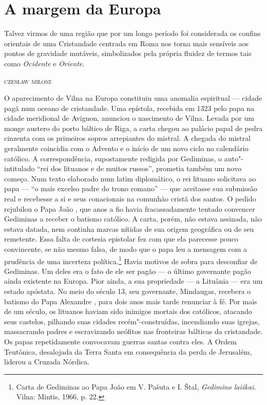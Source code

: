 %

\chapter{A margem da Europa}

\epigraph{Talvez virmos de uma região que por um longo período foi considerada os
confins orientais de uma Cristandade centrada em Roma nos torna mais
sensíveis aos pontos de gravidade mutáveis, simbolizados pela própria
fluidez de termos tais como \textit{Ocidente} e \textit{Oriente}.}{\textsc{czesław miłosz}}

O aparecimento de Vilna na Europa constituiu uma anomalia espiritual ---
cidade pagã num oceano de cristandade. Uma epístola, recebida em 1323
pelo papa na cidade meridional de Avignon, anunciou o nascimento de
Vilna. Levada por um monge austero do porto báltico de Riga, a carta
chegou ao palácio papal de pedra cinzenta com os primeiros sopros
arrepiantes do mistral. A chegada do mistral geralmente coincidia com o
Advento e o início de um novo ciclo no calendário católico. A
correspondência, supostamente redigida por Gediminas, o auto"-intitulado
``rei dos lituanos e de muitos russos'', prometia também um novo começo.
Num texto elaborado num latim diplomático, o rei lituano solicitava ao
papa --- ``o mais excelso padre do trono romano'' --- que aceitasse sua
submissão real e recebesse a si e seus conacionais na comunhão cristã
dos santos. O pedido rejubilou o Papa João , que anos a fio havia
fracassadamente tentado convencer Gediminas a receber o batismo
católico. A carta, porém, não estava assinada, não estava datada, nem
continha marcas nítidas de sua origem geográfica ou de seu remetente.
Essa falta de cortesia epistolar fez com que ela parecesse pouco
convincente, se não mesmo falsa, de modo que o papa leu a mensagem com a
prudência de uma incerteza política.\footnote{Carta de Gediminas ao Papa João  em V. Pašuta e I. Štal, \textit{Gedimino laiškai}. Vilna: Mintis, 1966, p. 22.}
Havia motivos de sobra para desconfiar de Gediminas. Um deles era o fato
de ele ser pagão --- o último governante pagão ainda existente na Europa.
Pior ainda, a sua propriedade --- a Lituânia --- era um estado apóstata. No
meio do século 13, seu governante, Mindaugas, recebera o batismo do Papa
Alexandre , para dois anos mais tarde renunciar à fé. Por mais de um
século, os lituanos haviam sido inimigos mortais dos católicos, atacando
seus castelos, pilhando suas cidades recém"-construídas, incendiando suas
igrejas, massacrando padres e escravizando neófitos nas fronteiras
bálticas da cristandade. Os papas repetidamente convocavam guerras
santas contra eles. A Ordem Teutônica, desalojada da Terra Santa em
consequência da perda de Jerusalém, liderou a Cruzada Nórdica.

